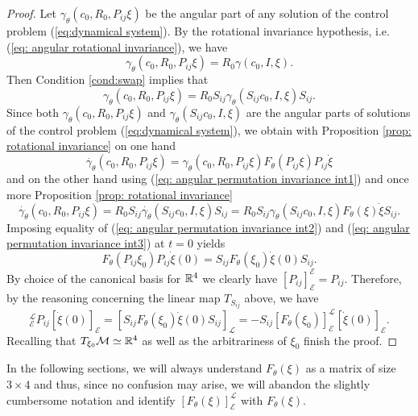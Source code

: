\begin{proof}
Let $\gamma_\theta(c_0, R_0, P_{ij}\xi)$ be the angular part of any solution of the control problem (\ref{eq:dynamical system}). By the rotational invariance hypothesis, i.e. (\ref{eq: angular rotational invariance}), we have
\begin{equation}
	\gamma_\theta(c_0, R_0, P_{ij}\xi) = R_0 \gamma(c_0, I, \xi).
\end{equation}
Then Condition \ref{cond:swap} implies that
\begin{equation}
\label{eq: angular permutation invariance int1}
	\gamma_\theta(c_0, R_0,P_{ij} \xi) = R_0 S_{ij} \gamma_\theta(S_{ij}c_0, I, \xi) S_{ij}.
\end{equation}
Since both $\gamma_\theta(c_0, R_0, P_{ij} \xi)$ and $\gamma_\theta(S_{ij} c_0, I, \xi)$ are the angular parts of solutions of the control problem (\ref{eq:dynamical system}), we obtain with Proposition \ref{prop: rotational invariance} on one hand
\begin{equation}
\label{eq: angular permutation invariance int2}
	\dot{\gamma_\theta}(c_0, R_0, P_{ij} \xi)= \gamma_\theta(c_0, R_0, P_{ij} \xi) F_{\theta}(P_{ij} \xi) P_{ij } \dot{\xi}
\end{equation}
and on the other hand using (\ref{eq: angular permutation invariance int1}) and once more Proposition \ref{prop: rotational invariance}
\begin{equation}
\label{eq: angular permutation invariance int3}
	\dot{\gamma_\theta}(c_0, R_0, P_{ij} \xi) =  R_0 S_{ij} \dot{\gamma_\theta}(S_{ij} c_0, I, \xi) S_{ij} = R_0 S_{ij} \gamma_\theta(S_{ij} c_0, I, \xi) F_{\theta}(\xi) \dot{\xi} S_{ij}.
\end{equation}
Imposing equality of (\ref{eq: angular permutation invariance int2}) and (\ref{eq: angular permutation invariance int3}) at $t = 0$ yields
\begin{equation}
	F_{\theta}(P_{ij} \xi_0) P_{ij}  \dot{\xi}(0) = S_{ij} F_{\theta}(\xi_0) \dot{\xi}(0) S_{ij}.
\end{equation}
By choice of the canonical basis for $\mathbb{R}^4$ we clearly have $[P_{ij}]_{\mathcal{E}}^{\mathcal{E}} = P_{ij}$. Therefore, by the reasoning concerning the linear map $T_{S_{ij}}$ above, we have
\begin{equation}
	[F_{\theta}(P_{ij} \xi_0)]_{\mathcal{E}}^{\mathcal{L}}  P_{ij} [\dot{\xi}(0)]_{\mathcal{E}} = [S_{ij} F_{\theta}(\xi_0) \dot{\xi}(0) S_{ij}]_{\mathcal{L}} = -S_{ij} [F_{\theta}(\xi_0)]_{\mathcal{E}}^{\mathcal{L}} [\dot{\xi}(0)]_{\mathcal{E}}.
\end{equation}
Recalling that $T_{\xi_0} \mathcal{M} \simeq \mathbb{R}^4$ as well as the arbitrariness of $\xi_0$ finish the proof.
\end{proof}

In the following sections, we will always understand $F_{\theta}(\xi)$ as a matrix of size $3 \times 4$ and thus, since no confusion may arise, we will abandon the slightly cumbersome notation and identify $[F_{\theta}(\xi)]_{\mathcal{E}}^{\mathcal{L}}$ with $F_{\theta}(\xi)$.





